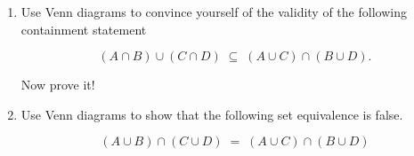 \begin{enumerate}
 \wbvfill
 
 \workbookpagebreak
 \hintspagebreak

\item Use Venn diagrams to convince yourself of the validity of
the following containment statement

\[ (A \cap B) \cup (C \cap D) \; \subseteq \; (A \cup C) \cap (B \cup D).\]

Now prove it!
 
 
 \wbvfill
 
 \workbookpagebreak
 
\item Use Venn diagrams to show that the following set equivalence is false.

\[ (A \cup B) \cap (C \cup D) \; = \; (A \cup C) \cap (B \cup D) \]


\wbvfill
 
 \workbookpagebreak
 
\end{enumerate}




